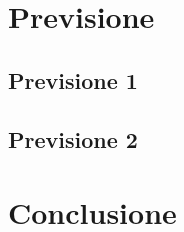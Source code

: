 \documentclass[11pt,a4paper]{article}
\begin{document}
\section{Previsione}
\subsection{Previsione 1}	%
\subsection{Previsione 2}	%


\section{Conclusione}
\end{document}
